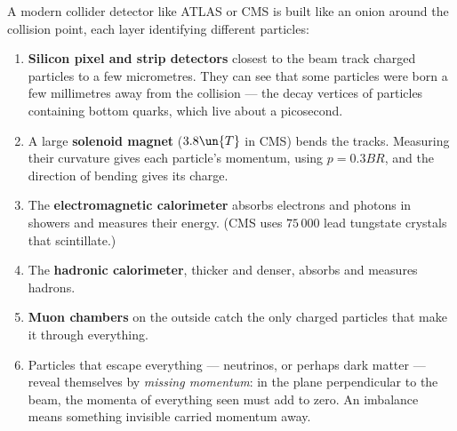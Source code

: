 A modern collider detector like ATLAS or CMS is built like an onion around the collision point, each layer identifying different particles:
\begin{enumerate}[itemsep=3pt]
  \item \textbf{Silicon pixel and strip detectors} closest to the beam track charged particles to a few micrometres. They can see that some particles were born a few millimetres away from the collision --- the decay vertices of particles containing bottom quarks, which live about a picosecond.
  \item A large \textbf{solenoid magnet} ($3.8\un{T}$ in CMS) bends the tracks. Measuring their curvature gives each particle's momentum, using $p = 0.3BR$, and the direction of bending gives its charge.
  \item The \textbf{electromagnetic calorimeter} absorbs electrons and photons in showers and measures their energy. (CMS uses $75\,000$ lead tungstate crystals that scintillate.)
  \item The \textbf{hadronic calorimeter}, thicker and denser, absorbs and measures hadrons.
  \item \textbf{Muon chambers} on the outside catch the only charged particles that make it through everything.
  \item Particles that escape everything --- neutrinos, or perhaps dark matter --- reveal themselves by \emph{missing momentum}: in the plane perpendicular to the beam, the momenta of everything seen must add to zero. An imbalance means something invisible carried momentum away.
\end{enumerate}
